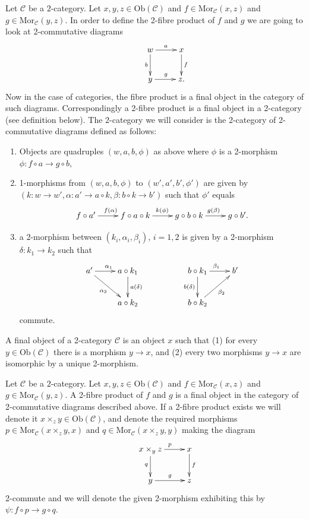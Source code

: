 \medskip\noindent
Let $\mathcal{C}$ be a $2$-category. Let $x,y,z\in \text{Ob}(\mathcal{C})$ and
$f\in \text{Mor}_{\mathcal{C}}(x,z)$ and $g\in \text{Mor}_{\mathcal C}(y,z)$.
In order to define the 2-fibre product of $f$ and $g$ we are going to look at
2-commutative diagrams
$$
\xymatrix{
&w \ar[r]^{a} \ar[d]_{b} & x \ar[d]^{f} \\
&y \ar[r]^{g} & z. }
$$
Now in the case of categories, the fibre product is a final object in the
category of such diagrams. Correspondingly a 2-fibre product is a final object
in a 2-category (see definition below). The 2-category we will consider is
the 2-category of 2-commutative diagrams defined as follows:
\begin{enumerate}
\item Objects are quadruples $(w,a,b,\phi)$ as above where $\phi$
is a 2-morphism $\phi : f \circ a \to g \circ b$, 
\item 1-morphisms from $(w,a,b,\phi)$ to $(w',a',b',\phi')$
are given by $(k : w \to w', \alpha : a' \to a \circ k,
\beta : b \circ k \to b')$ such that $\phi'$ equals 
$$
\xymatrix{
f \circ a' \ar[r]^{f(\alpha)} &
f \circ a \circ k \ar[r]^{k(\phi)} &
g \circ b \circ k \ar[r]^{g(\beta)} &
g \circ b'. }
$$
\item a 2-morphism between $(k_i, \alpha_i, \beta_i)$, $i=1,2$ is given
by a 2-morphism $\delta : k_1 \to k_2$ such that 
$$
\xymatrix{
a' \ar[rd]_{\alpha_2} \ar[r]^{\alpha_1} & 
a \circ k_1 \ar[d]^{a(\delta)} &
&
b \circ k_1 \ar[r]^{\beta_1} \ar[d]_{b(\delta)} &
b'
\\
&
a \circ k_2 &
&
b \circ k_2 \ar[ru]_{\beta_2}
&
}
$$
commute.
\end{enumerate}

\begin{definition}
\label{definition-final-object-2-category}
A final object of a 2-category $\mathcal{C}$ is an object $x$ such that
(1) for every $y \in \text{Ob}(\mathcal{C})$ there is a morphism $y \to x$,
and (2) every two morphisms $y \to x$ are isomorphic by a unique 2-morphism.
\end{definition}

\begin{definition}
\label{definition-2-fibre-products}
Let $\mathcal{C}$ be a $2$-category.
Let $x,y,z\in \text{Ob}(\mathcal{C})$ and $f\in \text{Mor}_{\mathcal{C}}(x,z)$
and $g\in \text{Mor}_{\mathcal C}(y,z)$. A 2-fibre product of $f$ and $g$ is
a final object in the category of 2-commutative diagrams described above. If
a 2-fibre product exists we
will denote it $x\times_z y\in \text{Ob}(\mathcal{C})$, and denote the
required morphisms $p\in \text{Mor}_{\mathcal C}(x\times_z y,x)$ and 
$q\in \text{Mor}_{\mathcal C}(x\times_z y,y)$ making the diagram
$$
\xymatrix{
&x\times_y z \ar[r]^{p} \ar[d]_{q} & x \ar[d]^{f} \\
&y \ar[r]^{g} & z }
$$
2-commute and we will denote the given 2-morphism exhibiting this by
$\psi : f \circ p \to g \circ q$.
\end{definition}

